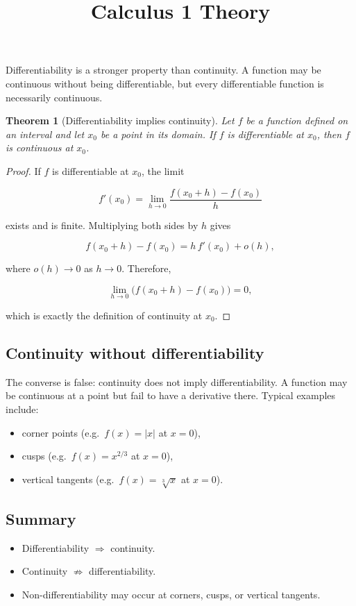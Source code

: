 \documentclass[11pt,a4paper]{article} \usepackage[T1]{fontenc}
\theoremstyle{plain} \newtheorem{theorem}{Theorem} \title{Calculus 1 Theory}
\begin{document}
Differentiability is a stronger property than continuity. A function may be
continuous without being differentiable, but every differentiable function is
necessarily continuous.

\begin{theorem}
[Differentiability implies continuity] Let $f$ be a function defined on an
interval and let $x_0$ be a point in its domain. If $f$ is differentiable at
$x_0$, then $f$ is continuous at $x_0$.
\end{theorem}

\begin{proof}
If $f$ is differentiable at $x_0$, the limit

\[
f'(x_0)=\lim_{h\to 0}\frac{f(x_0+h)-f(x_0)}{h}
\]

exists and is finite. Multiplying both sides by $h$ gives

\[
f(x_0+h)-f(x_0)=h\,f'(x_0)+o(h),
\]

where $o(h)\to 0$ as $h\to 0$. Therefore,

\[
\lim_{h\to 0}\bigl(f(x_0+h)-f(x_0)\bigr)=0,
\]

which is exactly the definition of continuity at $x_0$.
\end{proof}

\subsection*{Continuity without differentiability}

The converse is false: continuity does not imply differentiability. A function
may be continuous at a point but fail to have a derivative there. Typical
examples include:

\begin{itemize}
\item corner points (e.g.\ $f(x)=|x|$ at $x=0$),
\item cusps (e.g.\ $f(x)=x^{2/3}$ at $x=0$),
\item vertical tangents (e.g.\ $f(x)=\sqrt[3]{x}$ at $x=0$).
\end{itemize}

\subsection*{Summary}

\begin{itemize}
\item Differentiability $\Rightarrow$ continuity.
\item Continuity $\not\Rightarrow$ differentiability.
\item Non-differentiability may occur at corners, cusps, or vertical tangents.
\end{itemize}
\end{document}
